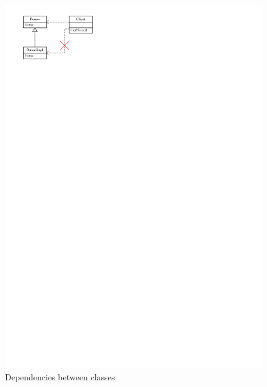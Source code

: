 		\begin{figure}[htb]
			\begin{center}
				\includegraphics{./files/inc/figures/DesignObjectDependency}
				\caption{\label{fig:DesignObjectDependency} Dependencies between classes}
			\end{center}
		\end{figure}

